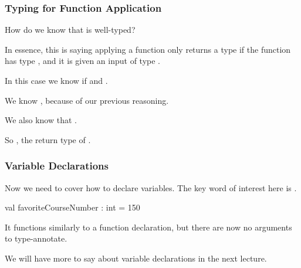 \documentclass[aspectratio=169, handout]{beamer}
\begin{document}
\begin{frame}[fragile]
  \frametitle{Typing for Function Application}

  How do we know that  is well-typed?

  \pause
  \vspace{\fill}


   \pause
  \vspace{\fill}

  In essence, this is saying applying a function only returns a type  if
  the function has type , and it is given an input of type .

  \pause
  \vspace{\fill}

  In this case we know  if  and .

  \pause
  \vspace{3pt}

  We know , because of our previous reasoning.

  \pause
  \vspace{3pt}

  We also know that .

  \pause
  \vspace{\fill}

  So , the return type of .
\end{frame}

\begin{frame}[fragile]
  \frametitle{Variable Declarations}

  Now we need to cover how to declare variables. The key word of interest here is
  .

  \vspace{\fill}

  \begin{codeblock}
    val favoriteCourseNumber : int = 150
  \end{codeblock}

  \pause
  \vspace{\fill}

  It functions similarly to a function declaration, but there are now no arguments
  to type-annotate.

  \pause
  \vspace{\fill}

  We will have more to say about variable declarations in the next lecture.
\end{frame}

\thankyou
\end{document}
